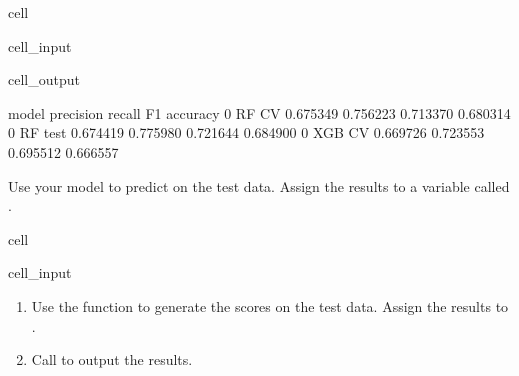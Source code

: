 \documentclass[letterpaper,10pt,english]{sphinxmanual}
\begin{document}
\begin{sphinxuseclass}{cell}
\begin{sphinxuseclass}{cell_input}
\begin{sphinxVerbatim}[commandchars=\\\{\}]
    
  \PYG{p}{[} \PYG{p}{]} 
\end{sphinxVerbatim}

\end{sphinxuseclass}
\begin{sphinxuseclass}{cell_output}
\begin{sphinxVerbatim}[commandchars=\\\{\}]
     model  precision    recall        F1  accuracy
0    RF CV   0.675349  0.756223  0.713370  0.680314
0  RF test   0.674419  0.775980  0.721644  0.684900
0   XGB CV   0.669726  0.723553  0.695512  0.666557
\end{sphinxVerbatim}

\end{sphinxuseclass}
\end{sphinxuseclass}
\sphinxAtStartPar
Use your model to predict on the test data. Assign the results to a variable called .

\begin{sphinxuseclass}{cell}
\begin{sphinxuseclass}{cell_input}
\begin{sphinxVerbatim}[commandchars=\\\{\}]
  
\end{sphinxVerbatim}

\end{sphinxuseclass}
\end{sphinxuseclass}\begin{enumerate}
%
\item {} 
\sphinxAtStartPar
Use the  function to generate the scores on the test data. Assign the results to .

\item {} 
\sphinxAtStartPar
Call  to output the results.

\end{enumerate}
\end{document}
